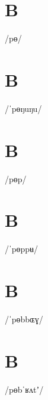 \documentclass[10pt,a4paper,twoside]{book}
\begin{document}
\section*{B}

\begin{multicols}{3}
 {/pɵ/} {}
\end{multicols}

\section*{B}

\begin{multicols}{3}
 {/ˈpɵŋuŋu/} {}
\end{multicols}

\section*{B}

\begin{multicols}{3}
 {/pɵp/} {}
\end{multicols}

\section*{B}

\begin{multicols}{3}
 {/ˈpɵppʉ/} {}
\end{multicols}

\section*{B}

\begin{multicols}{3}
 {/ˈpɵbbɶɣ/} {}
\end{multicols}

\section*{B}

\begin{multicols}{3}
 {/pɵbˈʁʌtʼ/} {}
\end{multicols}
\end{document}
